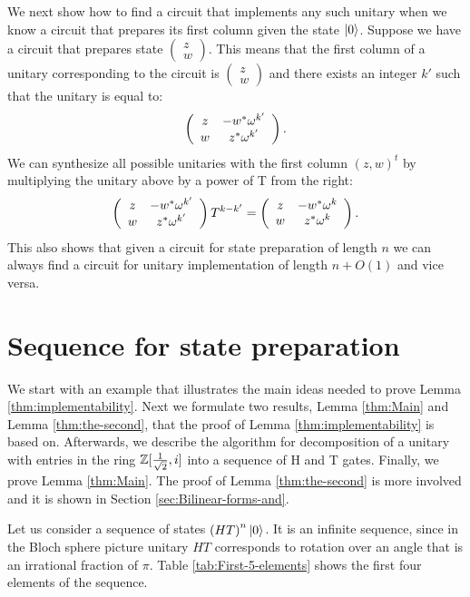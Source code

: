 \documentclass[english,journal]{extarticle}
\theoremstyle{plain}
\theoremstyle{plain}
\theoremstyle{plain}
\theoremstyle{definition}
\theoremstyle{plain}
\theoremstyle{plain}
\begin{document}
We next show how to find a circuit that implements any such unitary
when we know a circuit that prepares its first column given the 
state $\left|0\right\rangle$.  Suppose we have a circuit that prepares state
$\left(\begin{array}{c}
z\\
w
\end{array}\right)$. This means that the first column of a unitary corresponding
to the circuit is $\left(\begin{array}{c}
z\\
w
\end{array}\right)$ and there exists an integer $k'$ such that the unitary is equal
to: 
\[
\left(\begin{array}{cc}
z & -w^{*}\omega^{k'}\\
w & z^{*}\omega^{k'}
\end{array}\right).
\]
We can synthesize all possible unitaries with the first column $\left(z,w\right)^{t}$
by multiplying the unitary above by a power of T from the right:
\[
\left(\begin{array}{cc}
z & -w^{*}\omega^{k'}\\
w & z^{*}\omega^{k'}
\end{array}\right)T^{k-k'}=\left(\begin{array}{cc}
z & -w^{*}\omega^{k}\\
w & z^{*}\omega^{k}
\end{array}\right).
\]
This also shows that given a circuit for state preparation of length $n$
we can always find a circuit for unitary implementation of length $n+O(1)$
and vice versa. 

\section{\label{sec:Sequence-for-state}Sequence for state preparation }
\label{sec:4}
\noindent
We start with an example that illustrates the main ideas needed to
prove Lemma \ref{thm:implementability}.  Next we formulate two
results, Lemma \ref{thm:Main} and Lemma \ref{thm:the-second}, that the proof of Lemma \ref{thm:implementability} is based on. 
Afterwards, we describe the algorithm for decomposition of a
unitary with entries in the ring $\mathbb{Z}[\frac{1}{\sqrt{2}},i]$ into a sequence of H and T
gates.  Finally, we prove Lemma \ref{thm:Main}.  The proof of Lemma \ref{thm:the-second}
is more involved and it is shown in Section \ref{sec:Bilinear-forms-and}.

Let us consider a sequence of states $\left(HT\right)^{n}\left|0\right\rangle$.
It is an infinite sequence, since in the Bloch sphere picture unitary
$HT$ corresponds to rotation over an angle that is an irrational
fraction of $\pi$.  Table \ref{tab:First-5-elements} shows the first
four elements of the sequence. 
\end{document}
